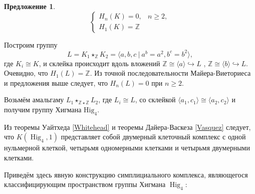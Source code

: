 \documentclass[14pt, dvipsnames, twoside]{extarticle}
\newtheorem{proposition}{Предложение}
\theoremstyle{definition}
\theoremstyle{remark}
\DeclareMathOperator{\Hig}{\mathrm{Hig}}
\begin{document}
\begin{proposition}
$$\begin{cases}
H_{n}(K)=0, & n\geqslant2,\\
H_{1}(K)=\mathbb{Z}
\end{cases}$$
\end{proposition}

Построим группу $$L= K_1\star_{\mathbb{Z}} K_2=\langle a, b, c\ |\  a^b=a^2, b^c=b^2 \rangle,$$ где $K_i\cong K$, и склейка происходит вдоль вложений $\mathbb{Z}\cong \langle a \rangle\hookrightarrow L$ , $\mathbb{Z}\cong\langle b \rangle\hookrightarrow L$. Очевидно, что $H_1(L)=\mathbb{Z}$. Из точной последовательности Майера-Виеториеса и предложения выше следует, что $H_n(L)=0$ при $n\geqslant 2$.

Возьмём амальгаму $L_1\star_{\mathbb{Z}\star\mathbb{Z}} L_2$, где $L_i\cong L$, со склейкой $\langle a_1, c_1 \rangle \cong \langle a_2, c_2 \rangle$ и получим группу Хигмана $\mathrm{Hig}_4$.

Из теоремы Уайтхеда \ref{Whitehead} и теоремы Дайера-Васкеза \ref{Vasquez} следует, что $K(\Hig_4, 1)$ представляет собой двумерный клеточный комплекс с одной нульмерной клеткой, четырьмя одномерными клетками и четырьмя двумерными клетками.


Приведём здесь явную конструкцию симплициального комплекса, являющегося классифицирующим пространством группы Хигмана $\Hig_4$:
\end{document}
